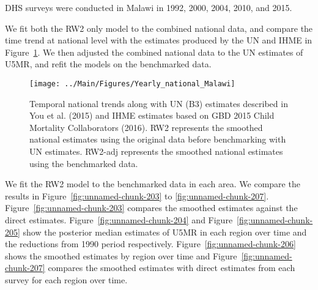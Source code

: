 \documentclass[12pt]{article}\usepackage[]{graphicx}\usepackage[]{color}
\newenvironment{knitrout}{}{} %
\begin{document}


DHS surveys were conducted in Malawi in 1992, 2000, 2004, 2010, and 2015.

We fit both the RW2 only model to the combined national data, and compare the time trend at national level with the estimates produced by the UN and IHME in Figure~\ref{fig:unnamed-chunk-202}. We then adjusted the combined national data to the UN estimates of U5MR, and refit the models on the benchmarked data. 

\begin{knitrout}
\color{fgcolor}\begin{figure}[bht]

{\centering \texttt{[image: ../Main/Figures/Yearly\_national\_Malawi]} 

}

\caption[Temporal national trends along with UN (B3) estimates described in You et al]{Temporal national trends along with UN (B3) estimates described in You et al. (2015) and IHME estimates based on GBD 2015 Child Mortality Collaborators (2016). RW2 represents the smoothed national estimates using the original data before benchmarking with UN estimates. RW2-adj represents the smoothed national estimates using the benchmarked data.}\label{fig:unnamed-chunk-202}
\end{figure}


\end{knitrout}
 

We fit the RW2 model to the benchmarked data in each area. 
We compare the results in Figure~\ref{fig:unnamed-chunk-203} to \ref{fig:unnamed-chunk-207}.
Figure~\ref{fig:unnamed-chunk-203} compares the smoothed estimates against the direct estimates. Figure~\ref{fig:unnamed-chunk-204} and Figure~\ref{fig:unnamed-chunk-205} show the posterior median estimates of U5MR in each region over time and the reductions from 1990 period respectively.
Figure~\ref{fig:unnamed-chunk-206} shows the smoothed estimates by region over time and Figure~\ref{fig:unnamed-chunk-207} compares the smoothed estimates with direct estimates from each survey for each region over time.


\end{document}
